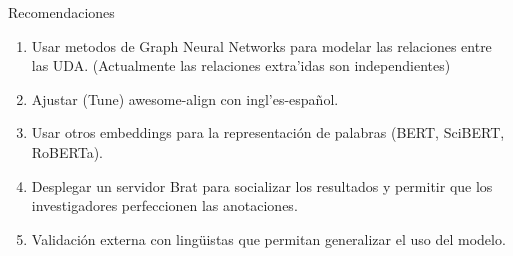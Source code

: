 \begin{recomendations}
    Recomendaciones

    \begin{enumerate}
        \item Usar metodos de Graph Neural Networks para modelar las relaciones entre las UDA. (Actualmente las relaciones extra'idas son independientes)
        \item Ajustar (Tune) awesome-align con ingl'es-español.
        \item Usar otros embeddings para la representación de palabras (BERT, SciBERT, RoBERTa).
        \item Desplegar un servidor Brat para socializar los resultados y permitir que los investigadores perfeccionen las anotaciones.
        \item Validación externa con lingüistas que permitan generalizar el uso del modelo.
    \end{enumerate}
\end{recomendations}
